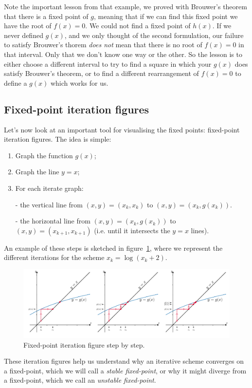 Note the important lesson from that example, we proved with Brouwer's theorem that there is a fixed point of $g$, meaning that if we can find this fixed point we have the root of $f(x)=0$. We could not find a fixed point of $h(x)$. If we never defined $g(x)$, and we only thought of the second formulation, our failure to satisfy Brouwer's thorem \textit{does not} mean that there is no root of $f(x)=0$ in that interval. Only that we don't know one way or the other. So the lesson is to either choose a different interval to try to find a square in which your $g(x)$ does satisfy Brouwer's theorem, or to find a different rearrangement of $f(x)=0$ to define a $g(x)$ which works for us.

\subsection{Fixed-point iteration figures}
Let's now look at an important tool for visualising the fixed points: fixed-point iteration figures. The idea is simple:
\begin{enumerate}
	\item Graph the function $g(x)$;
	\item Graph the line $y=x$;
	\item For each iterate graph:
		\item[-] the vertical line from $(x,y)=(x_k,x_k)$ to $(x,y)=(x_k,g(x_k))$.
		\item[-] the horizontal line from $(x,y)=(x_k,g(x_k))$ to $(x,y)=(x_{k+1},x_{k+1})$ (i.e. until it intersects the $y=x$ lines).
\end{enumerate}
An example of these steps is sketched in figure~\ref{fig:ch2_fpfigures}, where we represent the different iterations for the scheme $x_k = \log(x_k + 2)$. 
\begin{figure}[H]
	\begin{center}
	\includegraphics[width=\linewidth]{figures/ch2_fixedpoint.pdf} 
	  \caption{Fixed-point iteration figure step by step.} \label{fig:ch2_fpfigures}
	\end{center}
\end{figure}
\noindent These iteration figures help us understand why an iterative scheme converges on a fixed-point, which we will call a \textit{stable fixed-point}, or why it might diverge from a fixed-point, which we call an \textit{unstable fixed-point}.

